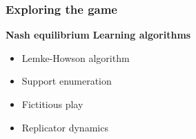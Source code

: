 \begin{frame}
    \frametitle{Exploring the game}
    
    \large
    \textbf{Nash equilibrium}
    \hspace{2cm}
    \textbf{Learning algorithms}

    \normalsize
    \vspace{0.5cm}
    \begin{multicols}{2}
        \begin{itemize}
            \item Lemke-Howson algorithm
            \vspace{0.5cm}
            \item Support enumeration

            \item Fictitious play
            \vspace{0.5cm}
            \item Replicator dynamics
        \end{itemize}
    \end{multicols}
\end{frame}


